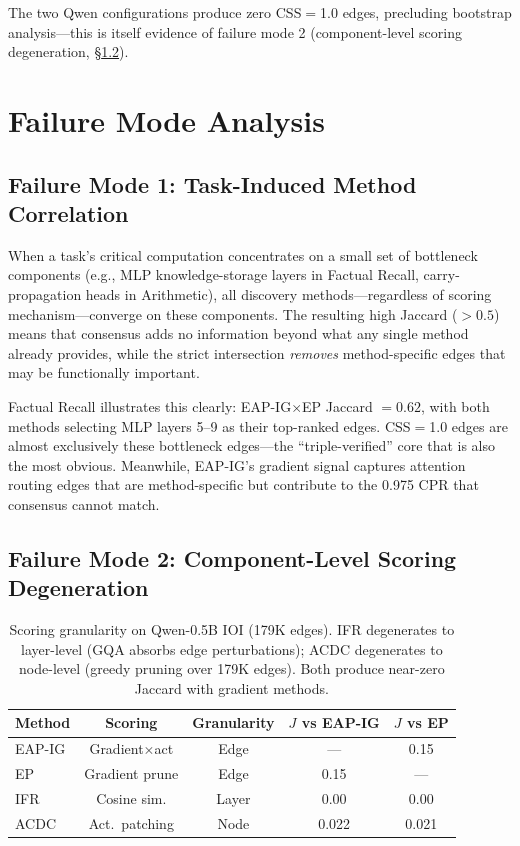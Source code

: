 \documentclass[11pt,a4paper]{article}
\newcommand{\cpr}{\textsc{CPR}}
\newcommand{\eapig}{\textsc{EAP-IG}}
\newcommand{\acdc}{\textsc{ACDC}}
\newcommand{\ep}{\textsc{EP}}
\newcommand{\ifr}{\textsc{IFR}}
\begin{document}
The two Qwen configurations produce zero CSS$=$1.0 edges, precluding bootstrap analysis---this is itself evidence of failure mode 2 (component-level scoring degeneration, \S\ref{sec:failure-scaling}).

\section{Failure Mode Analysis}
\label{sec:failure-modes}

\subsection{Failure Mode 1: Task-Induced Method Correlation}
\label{sec:failure-correlation}

When a task's critical computation concentrates on a small set of bottleneck components (e.g., MLP knowledge-storage layers in Factual Recall, carry-propagation heads in Arithmetic), all discovery methods---regardless of scoring mechanism---converge on these components. The resulting high Jaccard ($>0.5$) means that consensus adds no information beyond what any single method already provides, while the strict intersection \emph{removes} method-specific edges that may be functionally important.

Factual Recall illustrates this clearly: EAP-IG$\times$EP Jaccard $= 0.62$, with both methods selecting MLP layers 5--9 as their top-ranked edges. CSS$=$1.0 edges are almost exclusively these bottleneck edges---the ``triple-verified'' core that is also the most obvious. Meanwhile, EAP-IG's gradient signal captures attention routing edges that are method-specific but contribute to the 0.975 \cpr{} that consensus cannot match.

\subsection{Failure Mode 2: Component-Level Scoring Degeneration}
\label{sec:failure-scaling}

\begin{table}[t]
\centering
\small
\begin{tabular}{lcccc}
\toprule
\textbf{Method} & \textbf{Scoring} & \textbf{Granularity} & \textbf{$J$ vs \eapig{}} & \textbf{$J$ vs \ep{}} \\
\midrule
\eapig{}  & Gradient$\times$act & Edge  & --- & 0.15 \\
\ep{}     & Gradient prune & Edge  & 0.15 & --- \\
\ifr{}    & Cosine sim.    & Layer & 0.00 & 0.00 \\
\acdc{}   & Act.\ patching & Node  & 0.022 & 0.021 \\
\bottomrule
\end{tabular}
\caption{Scoring granularity on Qwen-0.5B IOI (179K edges). \ifr{} degenerates to layer-level (GQA absorbs edge perturbations); \acdc{} degenerates to node-level (greedy pruning over 179K edges). Both produce near-zero Jaccard with gradient methods.}
\label{tab:scaling}
\end{table}
\end{document}
